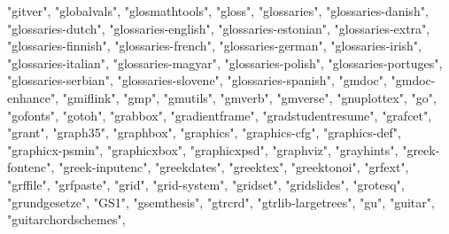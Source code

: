 \documentclass[
]{article}
\newenvironment{Shaded}{\begin{snugshade}}{\end{snugshade}}
\newcommand{\NormalTok}[1]{#1}
\newcommand{\StringTok}[1]{\textcolor[rgb]{0.31,0.60,0.02}{#1}}
\begin{document}
\begin{Shaded}
\begin{Highlighting}[]
\StringTok{"gitver"}\NormalTok{, }\StringTok{"globalvals"}\NormalTok{, }\StringTok{"glosmathtools"}\NormalTok{, }\StringTok{"gloss"}\NormalTok{, }\StringTok{"glossaries"}\NormalTok{, }
\StringTok{"glossaries{-}danish"}\NormalTok{, }\StringTok{"glossaries{-}dutch"}\NormalTok{, }\StringTok{"glossaries{-}english"}\NormalTok{, }
\StringTok{"glossaries{-}estonian"}\NormalTok{, }\StringTok{"glossaries{-}extra"}\NormalTok{, }\StringTok{"glossaries{-}finnish"}\NormalTok{, }
\StringTok{"glossaries{-}french"}\NormalTok{, }\StringTok{"glossaries{-}german"}\NormalTok{, }\StringTok{"glossaries{-}irish"}\NormalTok{, }
\StringTok{"glossaries{-}italian"}\NormalTok{, }\StringTok{"glossaries{-}magyar"}\NormalTok{, }\StringTok{"glossaries{-}polish"}\NormalTok{, }
\StringTok{"glossaries{-}portuges"}\NormalTok{, }\StringTok{"glossaries{-}serbian"}\NormalTok{, }\StringTok{"glossaries{-}slovene"}\NormalTok{, }
\StringTok{"glossaries{-}spanish"}\NormalTok{, }\StringTok{"gmdoc"}\NormalTok{, }\StringTok{"gmdoc{-}enhance"}\NormalTok{, }\StringTok{"gmiflink"}\NormalTok{, }\StringTok{"gmp"}\NormalTok{, }
\StringTok{"gmutils"}\NormalTok{, }\StringTok{"gmverb"}\NormalTok{, }\StringTok{"gmverse"}\NormalTok{, }\StringTok{"gnuplottex"}\NormalTok{, }\StringTok{"go"}\NormalTok{, }\StringTok{"gofonts"}\NormalTok{, }
\StringTok{"gotoh"}\NormalTok{, }\StringTok{"grabbox"}\NormalTok{, }\StringTok{"gradientframe"}\NormalTok{, }\StringTok{"gradstudentresume"}\NormalTok{, }\StringTok{"grafcet"}\NormalTok{, }
\StringTok{"grant"}\NormalTok{, }\StringTok{"graph35"}\NormalTok{, }\StringTok{"graphbox"}\NormalTok{, }\StringTok{"graphics"}\NormalTok{, }\StringTok{"graphics{-}cfg"}\NormalTok{, }\StringTok{"graphics{-}def"}\NormalTok{, }
\StringTok{"graphicx{-}psmin"}\NormalTok{, }\StringTok{"graphicxbox"}\NormalTok{, }\StringTok{"graphicxpsd"}\NormalTok{, }\StringTok{"graphviz"}\NormalTok{, }\StringTok{"grayhints"}\NormalTok{, }
\StringTok{"greek{-}fontenc"}\NormalTok{, }\StringTok{"greek{-}inputenc"}\NormalTok{, }\StringTok{"greekdates"}\NormalTok{, }\StringTok{"greektex"}\NormalTok{, }
\StringTok{"greektonoi"}\NormalTok{, }\StringTok{"grfext"}\NormalTok{, }\StringTok{"grffile"}\NormalTok{, }\StringTok{"grfpaste"}\NormalTok{, }\StringTok{"grid"}\NormalTok{, }\StringTok{"grid{-}system"}\NormalTok{, }
\StringTok{"gridset"}\NormalTok{, }\StringTok{"gridslides"}\NormalTok{, }\StringTok{"grotesq"}\NormalTok{, }\StringTok{"grundgesetze"}\NormalTok{, }\StringTok{"GS1"}\NormalTok{, }\StringTok{"gsemthesis"}\NormalTok{, }
\StringTok{"gtrcrd"}\NormalTok{, }\StringTok{"gtrlib{-}largetrees"}\NormalTok{, }\StringTok{"gu"}\NormalTok{, }\StringTok{"guitar"}\NormalTok{, }\StringTok{"guitarchordschemes"}\NormalTok{, }

\end{Highlighting}
\end{Shaded}
\end{document}
